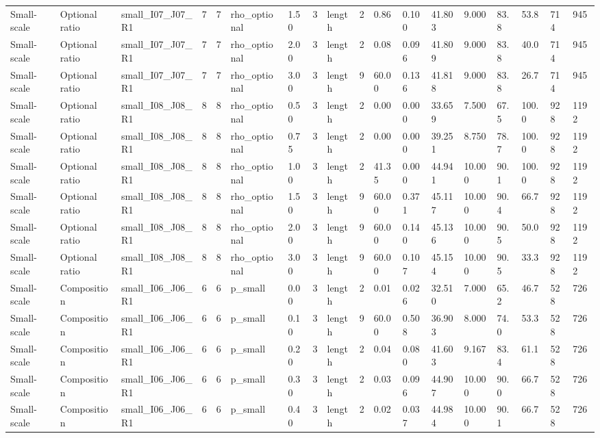 \begin{longtable}{lllrrllllrllllllll}
Small-scale & Optional ratio & small\_I07\_J07\_R1 & 7 & 7 & rho\_optional & 1.50 & 3 & length & 2 & 0.86 & 0.100 & 41.803 & 9.000 & 83.8 & 53.8 & 714 & 945 \\
Small-scale & Optional ratio & small\_I07\_J07\_R1 & 7 & 7 & rho\_optional & 2.00 & 3 & length & 2 & 0.08 & 0.096 & 41.809 & 9.000 & 83.8 & 40.0 & 714 & 945 \\
Small-scale & Optional ratio & small\_I07\_J07\_R1 & 7 & 7 & rho\_optional & 3.00 & 3 & length & 9 & 60.00 & 0.136 & 41.818 & 9.000 & 83.8 & 26.7 & 714 & 945 \\
Small-scale & Optional ratio & small\_I08\_J08\_R1 & 8 & 8 & rho\_optional & 0.50 & 3 & length & 2 & 0.00 & 0.000 & 33.659 & 7.500 & 67.5 & 100.0 & 928 & 1192 \\
Small-scale & Optional ratio & small\_I08\_J08\_R1 & 8 & 8 & rho\_optional & 0.75 & 3 & length & 2 & 0.00 & 0.000 & 39.251 & 8.750 & 78.7 & 100.0 & 928 & 1192 \\
Small-scale & Optional ratio & small\_I08\_J08\_R1 & 8 & 8 & rho\_optional & 1.00 & 3 & length & 2 & 41.35 & 0.000 & 44.941 & 10.000 & 90.1 & 100.0 & 928 & 1192 \\
Small-scale & Optional ratio & small\_I08\_J08\_R1 & 8 & 8 & rho\_optional & 1.50 & 3 & length & 9 & 60.00 & 0.371 & 45.117 & 10.000 & 90.4 & 66.7 & 928 & 1192 \\
Small-scale & Optional ratio & small\_I08\_J08\_R1 & 8 & 8 & rho\_optional & 2.00 & 3 & length & 9 & 60.00 & 0.140 & 45.136 & 10.000 & 90.5 & 50.0 & 928 & 1192 \\
Small-scale & Optional ratio & small\_I08\_J08\_R1 & 8 & 8 & rho\_optional & 3.00 & 3 & length & 9 & 60.00 & 0.107 & 45.154 & 10.000 & 90.5 & 33.3 & 928 & 1192 \\
Small-scale & Composition & small\_I06\_J06\_R1 & 6 & 6 & p\_small & 0.00 & 3 & length & 2 & 0.01 & 0.026 & 32.510 & 7.000 & 65.2 & 46.7 & 528 & 726 \\
Small-scale & Composition & small\_I06\_J06\_R1 & 6 & 6 & p\_small & 0.10 & 3 & length & 9 & 60.00 & 0.508 & 36.903 & 8.000 & 74.0 & 53.3 & 528 & 726 \\
Small-scale & Composition & small\_I06\_J06\_R1 & 6 & 6 & p\_small & 0.20 & 3 & length & 2 & 0.04 & 0.080 & 41.603 & 9.167 & 83.4 & 61.1 & 528 & 726 \\
Small-scale & Composition & small\_I06\_J06\_R1 & 6 & 6 & p\_small & 0.30 & 3 & length & 2 & 0.03 & 0.096 & 44.907 & 10.000 & 90.0 & 66.7 & 528 & 726 \\
Small-scale & Composition & small\_I06\_J06\_R1 & 6 & 6 & p\_small & 0.40 & 3 & length & 2 & 0.02 & 0.037 & 44.984 & 10.000 & 90.1 & 66.7 & 528 & 726 \\

\end{longtable}
